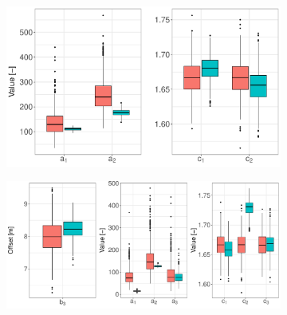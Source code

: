 \documentclass[11pt]{article}
\begin{document}
\begin{figure}[h!]
        \begin{subfigure}{0.39\textwidth}
            \centering
            \includegraphics[width=\linewidth]{Figs/7e-a&csPt.pdf}
            \caption{}
            \label{subfig:a's and c's Pt}
        \end{subfigure}
        \begin{subfigure}{0.49\textwidth}
            \centering
            \includegraphics[width=\linewidth]{Figs/7f-b3_as_cs_Restit.pdf}
            \caption{}
            \label{subfig:bac'sRes}
        \end{subfigure}
        \begin{subfigure}{0.1\textwidth}
            \centering

\end{subfigure}
\end{figure}
\end{document}

